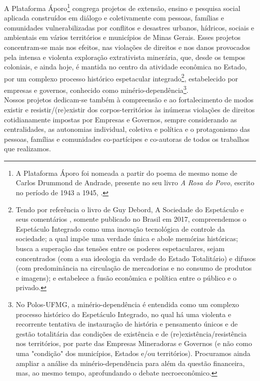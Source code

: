 \documentclass[14pt]{extarticle}
\begin{document}
A Plataforma Áporo\footnote{A Plataforma Áporo foi nomeada a partir do poema de mesmo nome de Carlos Drummond de Andrade, presente no seu livro \emph{A Rosa do Povo}, escrito no período de 1943 a 1945, \citep{andrade}.} congrega projetos de extensão, ensino e pesquisa social aplicada construídos em diálogo e coletivamente com pessoas, famílias e comunidades vulnerabilizadas por conflitos e desastres urbanos, hídricos, sociais e ambientais em vários territórios e municípios de Minas Gerais. Esses projetos concentram-se mais nos efeitos, nas violações de direitos e nos danos provocados pela intensa e violenta exploração extrativista minerária, que, desde os tempos coloniais, e ainda hoje, é mantida no centro da atividade econômica no Estado, por um complexo processo histórico espetacular integrado\footnote{Tendo por referência o livro de Guy Debord, A Sociedade do Espetáculo e seus comentários \citep{guy}, somente publicado no Brasil em 2017, compreendemos o Espetáculo Integrado como uma inovação tecnológica de controle da sociedade; a qual impõe uma verdade única e abole memórias históricas; busca a superação das tensões entre os poderes espetaculares, sejam concentrados (com a sua ideologia da verdade do Estado Totalitário) e difusos (com predominância na circulação de mercadorias e no consumo de produtos e imagens); e estabelece a fusão econômica e política entre o público e o privado.}, estabelecido por empresas e governos, conhecido como minério-dependência\footnote{No Polos-UFMG, a minério-dependência é entendida como um complexo processo histórico do Espetáculo Integrado, no qual há uma violenta e recorrente tentativa de instauração de história e pensamento únicos e de gestão totalitária das condições de existência e de (re)existência/resistência nos territórios, por parte das Empresas Mineradoras e Governos (e não como uma "condição" dos municípios, Estados e/ou territórios). Procuramos ainda ampliar a análise da minério-dependência para além da questão financeira, mas, ao mesmo tempo, aprofundando o debate necroeconômico.}.\\

Nossos projetos dedicam-se também à compreensão e ao fortalecimento de modos existir e resistir/(re)existir dos corpos-territórios às inúmeras violações de direitos cotidianamente impostas por Empresas e Governos, sempre considerando as centralidades, as autonomias individual, coletiva e política e o protagonismo das pessoas, famílias e comunidades co-partícipes e co-autoras de todos os trabalhos que realizamos.\\ 
\end{document}
